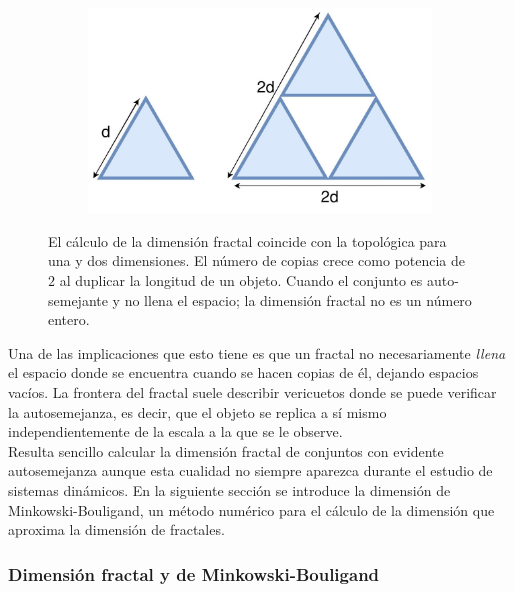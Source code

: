 \documentclass[letterpaper,12pt,oneside]{book}
\begin{document}
\begin{figure}[h]
\begin{subfigure}{.30\textwidth}
  \caption{}
  \label{fig:Dim_sub2}
\end{subfigure}%
\begin{subfigure}{.30\textwidth}
  \vspace{1.5cm}
  \centering
  \includegraphics[width=1\linewidth]{Ilustraciones/Cap_SFI/Escala_cubo.jpg}
  \caption{}
  \label{fig:Dim_sub3}
\end{subfigure}
\caption{El cálculo de la dimensión fractal coincide con la topológica para una y dos dimensiones. El número de copias crece como potencia de $2$ al duplicar la longitud de un objeto. Cuando el conjunto es auto-semejante y no llena el espacio; la dimensión fractal no es un número entero.}
\label{fig:Dimensiones}
\end{figure}

Una de las implicaciones que esto tiene es que un fractal no necesariamente \textit{llena} el espacio donde se encuentra cuando se hacen copias de él, dejando espacios vacíos. La frontera del fractal suele describir vericuetos donde se puede verificar la autosemejanza, es decir, que el objeto se replica a sí mismo independientemente de la escala a la que se le observe.
\\

Resulta sencillo calcular la dimensión fractal de conjuntos con evidente autosemejanza aunque esta cualidad no siempre aparezca durante el estudio de sistemas dinámicos. En la siguiente sección se introduce la dimensión de Minkowski-Bouligand, un método numérico para el cálculo de la dimensión que aproxima la dimensión de fractales.

\subsubsection{Dimensión fractal y de Minkowski-Bouligand}
\end{document}
